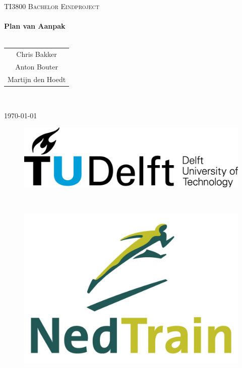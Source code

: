 


\begin{titlepage}
\center
\textsc{\huge TI3800 Bachelor Eindproject}\\[1.5cm]
\HRule \\[0.4cm]
{\Huge \bfseries Plan van Aanpak}\\[0.4cm]
\HRule \\[1.5cm]
\begin{Large}
\begin{tabular}{c}
Chris Bakker \\ 
Anton Bouter \\ 
Martijn den Hoedt\\
\end{tabular}\\[2cm]
\end{Large}

{\large \today}\\[2cm]

\begin{figure}[b]
\centering
\begin{minipage}{0.4\textwidth}
\begin{flushleft}
\includegraphics[width=0.9\linewidth]{images/TU_Delft_logo.png}
\end{flushleft}
\end{minipage}
~
\begin{minipage}{0.4\textwidth}
\begin{flushright}
\includegraphics[width=0.9\linewidth]{images/NedTrain_logo.png}
\end{flushright}
\end{minipage}\\[2cm]
\end{figure}

\vfill

\end{titlepage}


